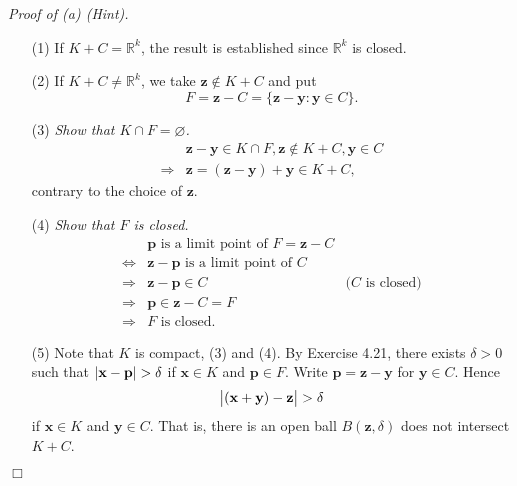 \documentclass{article}
\begin{document}
\emph{Proof of (a) (Hint).}
\begin{enumerate}
\item[(1)]
If $K+C = \mathbb{R}^k$, the result is established since $\mathbb{R}^k$ is closed.

\item[(2)]
If $K+C \neq \mathbb{R}^k$, we take $\mathbf{z} \notin K+C$
and put
\[
  F = \mathbf{z}-C = \{ \mathbf{z}-\mathbf{y} : \mathbf{y} \in C \}.
\]

\item[(3)]
\emph{Show that $K \cap F = \varnothing$.}
\begin{align*}
  &\mathbf{z}-\mathbf{y} \in K \cap F, \mathbf{z} \not\in K+C, \mathbf{y} \in C \\
  \Longrightarrow&
  \mathbf{z} = (\mathbf{z}-\mathbf{y}) + \mathbf{y} \in K+C,
\end{align*}
contrary to the choice of $\mathbf{z}$.

\item[(4)]
\emph{Show that $F$ is closed.}
\begin{align*}
  &\text{$\mathbf{p}$ is a limit point of $F = \mathbf{z}-C$} \\
  \Longleftrightarrow&
  \text{$\mathbf{z} - \mathbf{p}$ is a limit point of $C$} \\
  \Longrightarrow&
  \text{$\mathbf{z} - \mathbf{p} \in C$}
    &\text{($C$ is closed)} \\
  \Longrightarrow&
  \text{$\mathbf{p} \in \mathbf{z}-C = F$} \\
  \Longrightarrow&
  \text{$F$ is closed}.
\end{align*}

\item[(5)]
Note that $K$ is compact, (3) and (4).
By Exercise 4.21, there exists $\delta > 0$ such that
$\abs{\mathbf{x} - \mathbf{p}} > \delta$ if $\mathbf{x} \in K$ and $\mathbf{p} \in F$.
Write $\mathbf{p} = \mathbf{z} - \mathbf{y}$ for $\mathbf{y} \in C$.
Hence
\[
  \abs{(\mathbf{x}+\mathbf{y}) - \mathbf{z}} > \delta
\]
if $\mathbf{x} \in K$ and $\mathbf{y} \in C$.
That is, there is an open ball $B(\mathbf{z},\delta)$ does not intersect $K+C$.
\end{enumerate}
$\Box$\\
\end{document}
